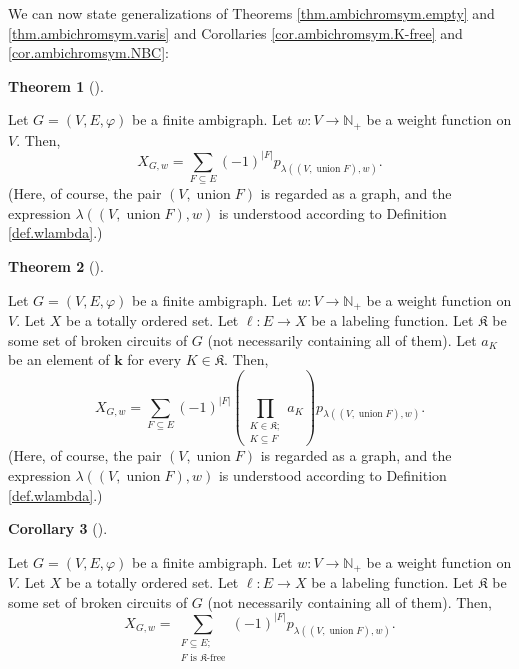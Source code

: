 \documentclass[numbers=enddot,12pt,final,onecolumn,notitlepage]{scrartcl}%
\theoremstyle{definition}
\newtheorem{theo}{Theorem}[section]
\newenvironment{theorem}[1][]
{\begin{theo}[#1]\begin{leftbar}}
{\end{leftbar}\end{theo}}
\newtheorem{coro}[theo]{Corollary}
\newenvironment{corollary}[1][]
{\begin{coro}[#1]\begin{leftbar}}
{\end{leftbar}\end{coro}}
\let\sumnonlimits\sum
\let\prodnonlimits\prod
\renewcommand{\sum}{\sumnonlimits\limits}
\renewcommand{\prod}{\prodnonlimits\limits}
\begin{document}
We can now state generalizations of Theorems \ref{thm.ambichromsym.empty} and
\ref{thm.ambichromsym.varis} and Corollaries \ref{cor.ambichromsym.K-free} and
\ref{cor.ambichromsym.NBC}:

\begin{theorem}
\label{thm.wambichromsym.empty}Let $G=\left(  V,E,\varphi\right)  $ be a
finite ambigraph. Let $w:V\rightarrow\mathbb{N}_{+}$ be a weight function on
$V$. Then,%
\[
X_{G,w}=\sum_{F\subseteq E}\left(  -1\right)  ^{\left\vert F\right\vert
}p_{\lambda\left(  \left(  V,\operatorname*{union}F\right)  ,w\right)  }.
\]
(Here, of course, the pair $\left(  V,\operatorname*{union}F\right)  $ is
regarded as a graph, and the expression $\lambda\left(  \left(
V,\operatorname*{union}F\right)  ,w\right)  $ is understood according to
Definition \ref{def.wlambda}.)
\end{theorem}

\begin{theorem}
\label{thm.wambichromsym.varis}Let $G=\left(  V,E,\varphi\right)  $ be a
finite ambigraph. Let $w:V\rightarrow\mathbb{N}_{+}$ be a weight function on
$V$. Let $X$ be a totally ordered set. Let $\ell:E\rightarrow X$ be a labeling
function. Let $\mathfrak{K}$ be some set of broken circuits of $G$ (not
necessarily containing all of them). Let $a_{K}$ be an element of $\mathbf{k}$
for every $K\in\mathfrak{K}$. Then,%
\[
X_{G,w}=\sum_{F\subseteq E}\left(  -1\right)  ^{\left\vert F\right\vert
}\left(  \prod_{\substack{K\in\mathfrak{K};\\K\subseteq F}}a_{K}\right)
p_{\lambda\left(  \left(  V,\operatorname*{union}F\right)  ,w\right)  }.
\]
(Here, of course, the pair $\left(  V,\operatorname*{union}F\right)  $ is
regarded as a graph, and the expression $\lambda\left(  \left(
V,\operatorname*{union}F\right)  ,w\right)  $ is understood according to
Definition \ref{def.wlambda}.)
\end{theorem}

\begin{corollary}
\label{cor.wambichromsym.K-free}Let $G=\left(  V,E,\varphi\right)  $ be a
finite ambigraph. Let $w:V\rightarrow\mathbb{N}_{+}$ be a weight function on
$V$. Let $X$ be a totally ordered set. Let $\ell:E\rightarrow X$ be a labeling
function. Let $\mathfrak{K}$ be some set of broken circuits of $G$ (not
necessarily containing all of them). Then,%
\[
X_{G,w}=\sum_{\substack{F\subseteq E;\\F\text{ is }\mathfrak{K}\text{-free}%
}}\left(  -1\right)  ^{\left\vert F\right\vert }p_{\lambda\left(  \left(
V,\operatorname*{union}F\right)  ,w\right)  }.
\]

\end{corollary}
\end{document}
